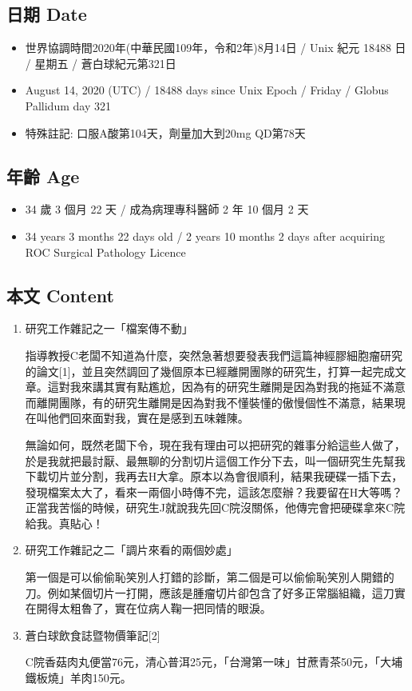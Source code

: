 \documentclass[a5paper, 11pt
]{book}
\providecommand{\tightlist}{%
  \setlength{\itemsep}{0pt}\setlength{\parskip}{0pt}}
\begin{document}
\hypertarget{ux65e5ux671f-date-64}{%
\subsection{日期 Date}\label{ux65e5ux671f-date-64}}

\begin{itemize}
\tightlist
\item
  世界協調時間2020年(中華民國109年，令和2年)8月14日 / Unix 紀元 18488 日
  / 星期五 / 蒼白球紀元第321日
\item
  August 14, 2020 (UTC) / 18488 days since Unix Epoch / Friday / Globus
  Pallidum day 321
\item
  特殊註記: 口服A酸第104天，劑量加大到20mg QD第78天
\end{itemize}

\hypertarget{ux5e74ux9f61-age-64}{%
\subsection{年齡 Age}\label{ux5e74ux9f61-age-64}}

\begin{itemize}
\tightlist
\item
  34 歲 3 個月 22 天 / 成為病理專科醫師 2 年 10 個月 2 天
\item
  34 years 3 months 22 days old / 2 years 10 months 2 days after
  acquiring ROC Surgical Pathology Licence
\end{itemize}

\hypertarget{ux672cux6587-content-64}{%
\subsection{本文 Content}\label{ux672cux6587-content-64}}

\begin{enumerate}
\def\labelenumi{\arabic{enumi}.}
\item
  研究工作雜記之一「檔案傳不動」

  指導教授C老闆不知道為什麼，突然急著想要發表我們這篇神經膠細胞瘤研究的論文{[}1{]}，並且突然調回了幾個原本已經離開團隊的研究生，打算一起完成文章。這對我來講其實有點尷尬，因為有的研究生離開是因為對我的拖延不滿意而離開團隊，有的研究生離開是因為對我不懂裝懂的傲慢個性不滿意，結果現在叫他們回來面對我，實在是感到五味雜陳。

  無論如何，既然老闆下令，現在我有理由可以把研究的雜事分給這些人做了，於是我就把最討厭、最無聊的分割切片這個工作分下去，叫一個研究生先幫我下載切片並分割，我再去H大拿。原本以為會很順利，結果我硬碟一插下去，發現檔案太大了，看來一兩個小時傳不完，這該怎麼辦？我要留在H大等嗎？正當我苦惱的時候，研究生J就說我先回C院沒關係，他傳完會把硬碟拿來C院給我。真貼心！
\item
  研究工作雜記之二「調片來看的兩個妙處」

  第一個是可以偷偷恥笑別人打錯的診斷，第二個是可以偷偷恥笑別人開錯的刀。例如某個切片一打開，應該是腫瘤切片卻包含了好多正常腦組織，這刀實在開得太粗魯了，實在位病人鞠一把同情的眼淚。
\item
  蒼白球飲食誌暨物價筆記{[}2{]}

  C院香菇肉丸便當76元，清心普洱25元，「台灣第一味」甘蔗青茶50元，「大埔鐵板燒」羊肉150元。
\end{enumerate}
\end{document}
